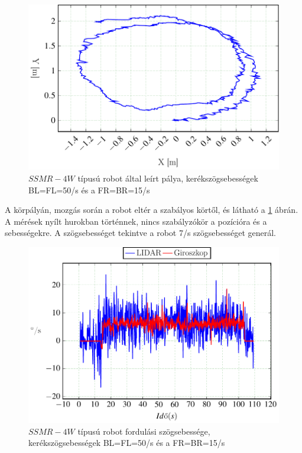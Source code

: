 \begin{figure}[H]
  \includegraphics{tikz/KorP0705b.pdf}
  \caption{$SSMR-4W$ típusú robot által leírt pálya, kerékszögsebességek BL=FL=50\degree/s és a FR=BR=15\degree/s}
  \label{fig:KorP0705b}
\end{figure}

A körpályán, mozgás során a robot eltér a szabályos körtől, és látható a \ref{fig:KorP0705b} ábrán. A mérések nyílt hurokban történnek, nincs szabályzókör a pozícióra és a sebességekre.
A szögsebességet tekintve a robot 7\degree/s szögsebességet generál.




\begin{figure}[H]
\begin{center}
  \includegraphics[scale=0.8]{tikz/KorP0705d.pdf}
\end{center}
  \caption{$SSMR-4W$ típusú robot fordulási szögsebessége, kerékszögsebességek BL=FL=50\degree/s és a FR=BR=15\degree/s}
  \label{fig:KorP0705d}
\end{figure}


